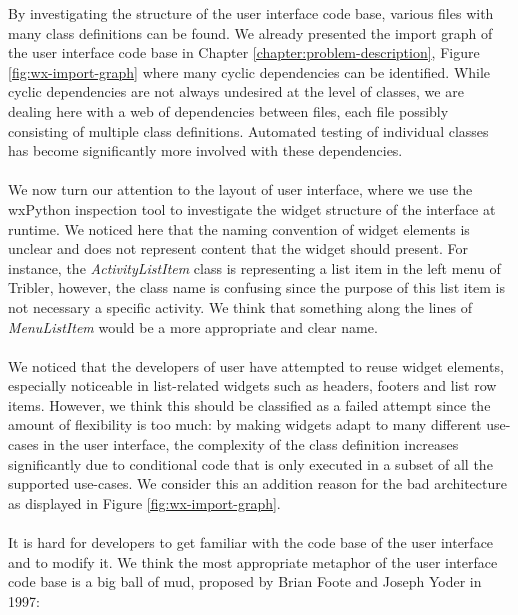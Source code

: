 By investigating the structure of the user interface code base, various files with many class definitions can be found. We already presented the import graph of the user interface code base in Chapter \ref{chapter:problem-description}, Figure \ref{fig:wx-import-graph} where many cyclic dependencies can be identified. While cyclic dependencies are not always undesired at the level of classes, we are dealing here with a web of dependencies between files, each file possibly consisting of multiple class definitions. Automated testing of individual classes has become significantly more involved with these dependencies.\\\\
We now turn our attention to the layout of user interface, where we use the wxPython inspection tool to investigate the widget structure of the interface at runtime. We noticed here that the naming convention of widget elements is unclear and does not represent content that the widget should present. For instance, the \emph{ActivityListItem} class is representing a list item in the left menu of Tribler, however, the class name is confusing since the purpose of this list item is not necessary a specific activity. We think that something along the lines of \emph{MenuListItem} would be a more appropriate and clear name.\\\\
We noticed that the developers of user have attempted to reuse widget elements, especially noticeable in list-related widgets such as headers, footers and list row items. However, we think this should be classified as a failed attempt since the amount of flexibility is too much: by making widgets adapt to many different use-cases in the user interface, the complexity of the class definition increases significantly due to conditional code that is only executed in a subset of all the supported use-cases. We consider this an addition reason for the bad architecture as displayed in Figure \ref{fig:wx-import-graph}.\\\\
It is hard for developers to get familiar with the code base of the user interface and to modify it. We think the most appropriate metaphor of the user interface code base is a big ball of mud, proposed by Brian Foote and Joseph Yoder in 1997\cite{foote1997big}:

